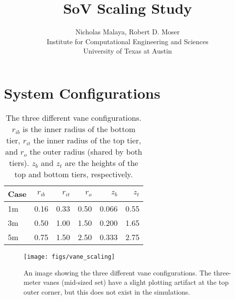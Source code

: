 \documentclass[english]{article}
\title{\bf{SoV Scaling Study}}
\author{Nicholas Malaya, Robert D. Moser \\ Institute for Computational Engineering and Sciences \\ University of Texas at Austin} \date{}
\begin{document}
\maketitle

\section*{System Configurations}

\begin{table}
\begin{centering}
  \begin{tabular}{ | l || c | r | r | r | r |}
    \hline     
    Case & $r_{ib}$ & $r_{it}$ & $r_{o}$ & $z_{b}$ & $z_{t}$ \\ \hline \hline
    1m   & 0.16     & 0.33     & 0.50    & 0.066   & 0.55 \\ \hline
    3m   & 0.50     & 1.00     & 1.50    & 0.200   & 1.65 \\ \hline
    5m   & 0.75     & 1.50     & 2.50    & 0.333   & 2.75 \\
    \hline 
  \end{tabular}
  \caption{The three different vane configurations. $r_{ib}$ is the inner radius of the bottom tier, 
    $r_{it}$ the inner radius of the top tier, and $r_{o}$ the outer radius (shared by both tiers). 
    $z_{b}$ and $z_{t}$ are the heights of the top and bottom tiers, respectively. }\label{fig:scaling_table}
\end{centering}
\end{table}
%

\begin{figure}[!htb]
  \begin{center}
    \texttt{[image: figs/vane\_scaling]}
    \caption{An image showing the three different vane configurations. The three-meter vanes (mid-sized set) 
      have a slight plotting artifact at the top outer corner, but this does not exist in the simulations. }
    \label{vane_scaling}
  \end{center}
\end{figure}
\end{document}
